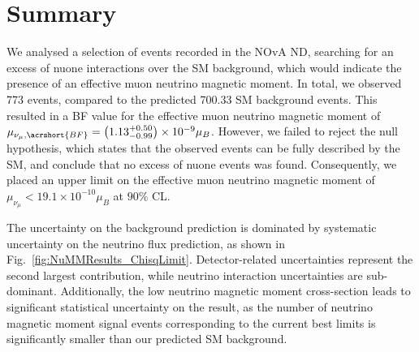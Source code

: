 
\section{Summary}\label{sec:NuMMConclusion}

We analysed a selection of events recorded in the \gls{NOvA} \gls{ND}, searching for an excess of \gls{nuone} interactions over the \gls{SM} background, which would indicate the presence of an effective muon neutrino magnetic moment. In total, we observed 773 events, compared to the predicted 700.33 \gls{SM} background events. This resulted in a \gls{BF} value for the effective muon neutrino magnetic moment of $\mu_{\nu_\mu,\acrshort{BF}}=\left(1.13^{+0.50}_{-0.99}\right)\times 10^{-9}\mu_B$. However, we failed to reject the null hypothesis, which states that the observed events can be fully described by the \gls{SM}, and conclude that no excess of \gls{nuone} events was found. Consequently, we placed an upper limit on the effective muon neutrino magnetic moment of $\mu_{\nu_\mu}<19.1\times10^{-10}\mu_B$ at $90\%$ \gls{CL}.

The uncertainty on the background prediction is dominated by systematic uncertainty on the neutrino flux prediction, as shown in Fig.~\ref{fig:NuMMResults_ChisqLimit}. Detector-related uncertainties represent the second largest contribution, while neutrino interaction uncertainties are sub-dominant. Additionally, the low neutrino magnetic moment cross-section leads to significant statistical uncertainty on the result, as the number of neutrino magnetic moment signal events corresponding to the current best limits is significantly smaller than our predicted \gls{SM} background.

